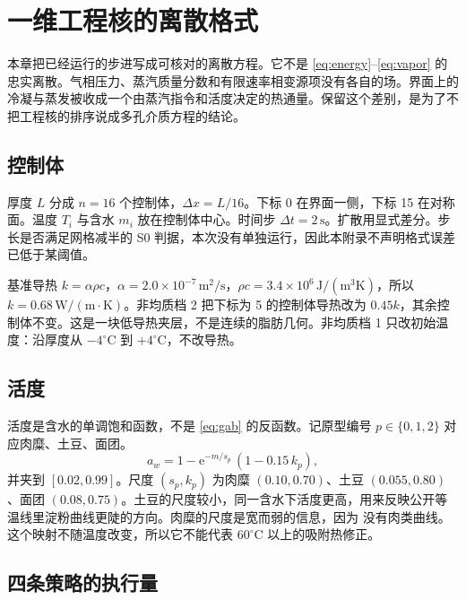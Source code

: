 \chapter{一维工程核的离散格式}
\label{app:discrete}

本章把已经运行的步进写成可核对的离散方程。它不是 \eqref{eq:energy}--\eqref{eq:vapor} 的忠实离散。气相压力、蒸汽质量分数和有限速率相变源项没有各自的场。界面上的冷凝与蒸发被收成一个由蒸汽指令和活度决定的热通量。保留这个差别，是为了不把工程核的排序说成多孔介质方程的结论。

\section{控制体}

厚度 \(L\) 分成 \(n=16\) 个控制体，\(\Delta x=L/16\)。下标 0 在界面一侧，下标 15 在对称面。温度 \(T_{i}\) 与含水 \(m_{i}\) 放在控制体中心。时间步 \(\Delta t=2\,\mathrm{s}\)。扩散用显式差分。步长是否满足网格减半的 S0 判据，本次没有单独运行，因此本附录不声明格式误差已低于某阈值。

基准导热 \(k=\alpha\rho c\)，\(\alpha=2.0\times 10^{-7}\,\mathrm{m}^2/\mathrm{s}\)，\(\rho c=3.4\times 10^{6}\,\mathrm{J}/(\mathrm{m}^3\mathrm{K})\)，所以 \(k=0.68\,\mathrm{W}/(\mathrm{m\cdot K})\)。非均质档 2 把下标为 5 的控制体导热改为 \(0.45k\)，其余控制体不变。这是一块低导热夹层，不是连续的脂肪几何。非均质档 1 只改初始温度：沿厚度从 \(-4^\circ\mathrm{C}\) 到 \(+4^\circ\mathrm{C}\)，不改导热。

\section{活度}

活度是含水的单调饱和函数，不是 \eqref{eq:gab} 的反函数。记原型编号 \(p\in\{0,1,2\}\) 对应肉糜、土豆、面团。
\begin{equation}
a_w=1-\mathrm{e}^{-m/s_p}\,(1-0.15\,k_p),
\end{equation}
并夹到 \([0.02,0.99]\)。尺度 \((s_p,k_p)\) 为肉糜 \((0.10,0.70)\)、土豆 \((0.055,0.80)\)、面团 \((0.08,0.75)\)。土豆的尺度较小，同一含水下活度更高，用来反映公开等温线里淀粉曲线更陡的方向。肉糜的尺度是宽而弱的信息，因为 \cite{sorption2026} 没有肉类曲线。这个映射不随温度改变，所以它不能代表 \(60^\circ\mathrm{C}\) 以上的吸附热修正。

\section{四条策略的执行量}


